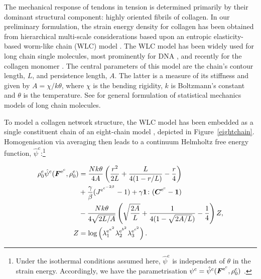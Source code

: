 The mechanical response of tendons in tension is determined primarily
by their dominant structural component: highly oriented fibrils of
collagen. In our preliminary formulation, the strain energy density
for collagen has been obtained from hierarchical multi-scale
considerations based upon an entropic elasticity-based worm-like chain
(WLC) model \citep{KratkyPorod:49}. The WLC model has been widely used
for long chain single molecules, most prominently for DNA
\citep{MarkoSiggia:95,Riefetal:97,Bustamanteetal:2003}, and recently
for the collagen mono\-mer \citep{Sunetal:2002}. The central
parameters of this model are the chain's contour length, $L$, and
persistence length, $A$. The latter is a measure of its stiffness and
given by $A = \chi/k\theta$, where $\chi$ is the bending rigidity, $k$
is Boltzmann's constant and $\theta$ is the temperature. See
\citet{LandLif} for general formulation of statistical mechanics
models of long chain molecules. 

To model a collagen network structure, the
WLC model has been embedded as a single constituent chain of an
eight-chain model \citep{Bischoffetal:2002, Bischoffetal1:2002},
depicted in \mbox{Figure~\ref{eightchain}}.  Homogenisation via
averaging then leads to a continuum Helmholtz free energy function,
$\hat{\psi}^\mathrm{c}$:\footnote{Under the isothermal conditions
  assumed here, $\hat{\psi}^\mathrm{c}$ is independent of
  $\theta$ in the 
  strain energy. Accordingly, we have the parametrisation
  ${\psi}^\mathrm{c}=\hat{\psi}^\mathrm{c}
  (\mbox{\boldmath$ F$}^{\mathrm{e}^\mathrm{c}},\rho^\mathrm{c}_{0})$ .}

\begin{equation}
\begin{split}
\rho^\mathrm{c}_{0}\hat{\psi}^\mathrm{c} (\mbox{\boldmath$ F$}^{\mathrm{e}^\mathrm{c}},\rho^\mathrm{c}_{0})
&= \frac{N k \theta}{4 A}\left(\frac{r^2}{2L} + \frac{L}{4(1-r/L)} -
\frac{r}{4}\right)\\ & +
\frac{\gamma}{\beta}({J^{\mathrm{e}^{\mathrm{c}^{-2\beta}}}} -1) +
\gamma{\bf 1}\colon(\mbox{\boldmath$ C$}^{\mathrm{e}^{\mathrm{c}}}-{\bf 1})\\ &-\frac{N
k \theta}{4\sqrt{2L/A}}\left(\sqrt{\frac{2A}{L}} + \frac{1}{4(1 -
\sqrt{2A/L})} -\frac{1}{4} \right) Z,\\ Z &=
\log\left(\lambda_1^{{\mathrm{e}}^{a^\mathrm{2}}}
\lambda_2^{{\mathrm{e}}^{b^\mathrm{2}}}
\lambda_3^{{\mathrm{e}}^{c^\mathrm{2}}}\right).
\label{wlcmeq}
\end{split}
\end{equation}

